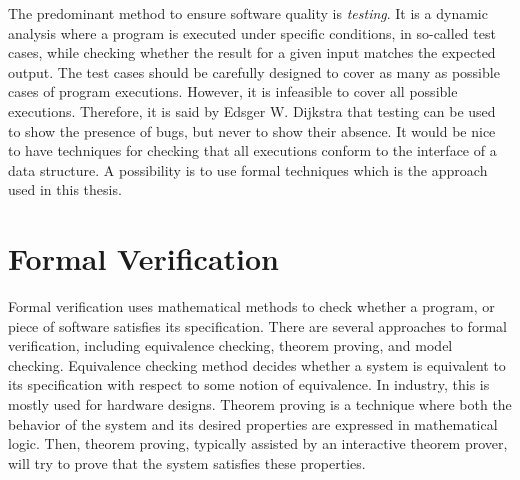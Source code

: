 
The predominant method to ensure software quality is
\emph{testing}. It is a dynamic analysis where a program is executed under specific conditions, in so-called test cases, while checking whether the result for a given input matches the expected output.
%
The test cases should be carefully designed to cover as many as possible cases of program executions.
However, it is infeasible to cover all possible executions. Therefore, it is said by Edsger W. Dijkstra that testing can be used to show the presence of bugs, but never to show their absence. 
It would be nice to have techniques for checking that all executions conform to the interface of a data structure.
A possibility is to use formal techniques which is the approach used in this thesis.

\section{Formal Verification} 
Formal verification uses mathematical methods to check whether a program, or piece of software satisfies its specification. 
There are several approaches to formal verification, including equivalence checking, theorem proving, and model checking. Equivalence checking method decides whether a system is equivalent to its specification with respect to some notion of equivalence. In industry, this is mostly used for hardware designs. Theorem proving is a technique where both the behavior of the system and its desired properties are expressed in mathematical logic. Then, theorem proving, typically assisted by an interactive theorem prover, will try to prove that the system satisfies these properties. 


